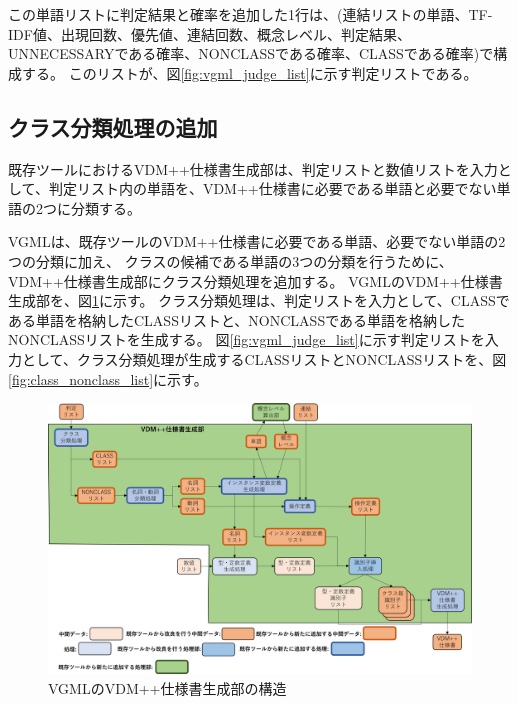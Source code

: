 この単語リストに判定結果と確率を追加した1行は、(連結リストの単語、TF-IDF値、出現回数、優先値、連結回数、概念レベル、判定結果、UNNECESSARYである確率、NONCLASSである確率、CLASSである確率)で構成する。
このリストが、図\ref{fig:vgml_judge_list}に示す判定リストである。

\subsection{クラス分類処理の追加}
\label{sec:classifier_class}
既存ツールにおけるVDM++仕様書生成部は、判定リストと数値リストを入力として、判定リスト内の単語を、VDM++仕様書に必要である単語と必要でない単語の2つに分類する。

VGMLは、既存ツールのVDM++仕様書に必要である単語、必要でない単語の2つの分類に加え、
クラスの候補である単語の3つの分類を行うために、VDM++仕様書生成部にクラス分類処理を追加する。
VGMLのVDM++仕様書生成部を、図\ref{fig:vgml_generator}に示す。
クラス分類処理は、判定リストを入力として、CLASSである単語を格納したCLASSリストと、NONCLASSである単語を格納したNONCLASSリストを生成する。
図\ref{fig:vgml_judge_list}に示す判定リストを入力として、クラス分類処理が生成するCLASSリストとNONCLASSリストを、図\ref{fig:class_nonclass_list}に示す。

\begin{figure}[t]
    \begin{center}
        \includegraphics[width=1.0\columnwidth]{image/vgml_generator.png}
        \caption{VGMLのVDM++仕様書生成部の構造}
        \label{fig:vgml_generator}
    \end{center}
\end{figure}

